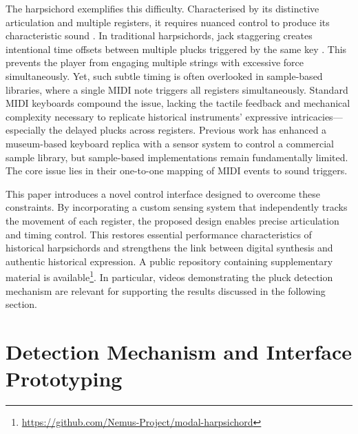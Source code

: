 The harpsichord exemplifies this difficulty. Characterised by its distinctive articulation and multiple registers, it requires nuanced control to produce its characteristic sound \cite{kottick1991acoustics}. In traditional harpsichords, jack staggering creates intentional time offsets between multiple plucks triggered by the same key \cite{diveroli2012harpsichord}. This prevents the player from engaging multiple strings with excessive force simultaneously. Yet, such subtle timing is often overlooked in sample-based libraries, where a single MIDI note triggers all registers simultaneously. Standard MIDI keyboards compound the issue, lacking the tactile feedback and mechanical complexity necessary to replicate historical instruments’ expressive intricacies—especially the delayed plucks across registers. Previous work has enhanced a museum-based keyboard replica with a sensor system \cite{hamilton2025augmentation} to control a commercial sample library, but sample-based implementations remain fundamentally limited. The core issue lies in their one-to-one mapping of MIDI events to sound triggers.

This paper introduces a novel control interface designed to overcome these constraints. By incorporating a custom sensing system that independently tracks the movement of each register, the proposed design enables precise articulation and timing control. This restores essential performance characteristics of historical harpsichords and strengthens the link between digital synthesis and authentic historical expression. 
A public repository containing supplementary material is available\footnote{\href{https://github.com/Nemus-Project/modal-harpsichord}{https://github.com/Nemus-Project/modal-harpsichord}}. In particular, videos demonstrating the pluck detection mechanism are relevant for supporting the results discussed in the following section. 

\section{Detection Mechanism and Interface Prototyping}

